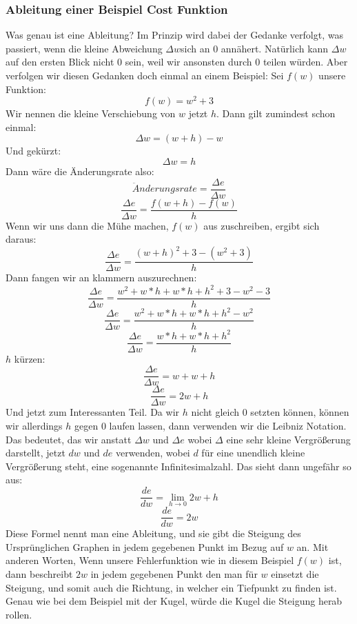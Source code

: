\documentclass[12pt]{article}
\begin{document}
\subsubsection{ Ableitung einer Beispiel Cost Funktion}
Was genau ist eine Ableitung? Im Prinzip wird dabei der Gedanke verfolgt, was passiert, wenn die kleine Abweichung $\Delta w$sich an 0 annähert. Natürlich kann $\Delta w$auf den ersten Blick nicht 0 sein, weil wir ansonsten durch 0 teilen würden. 
Aber verfolgen wir diesen Gedanken doch einmal an einem Beispiel:
Sei $f(w)$ unsere Funktion: $$f(w)=w^2+3$$
Wir nennen die kleine Verschiebung von $w$ jetzt $h$.
Dann gilt zumindest schon einmal: $$\Delta w=(w+h)-w$$Und gekürzt:$$\Delta w=h$$
Dann wäre die Änderungsrate also:$$\ddot{A}nderungsrate = \frac{\Delta e}{\Delta w}$$ $$\frac{\Delta e}{\Delta w}=\frac{f(w+h)-f(w)}{h}$$
Wenn wir uns dann die Mühe machen, $f(w)$ aus zuschreiben, ergibt sich daraus:
$$\frac{\Delta e}{\Delta w}=\frac{(w+h)^2+3-(w^2+3)}{h}$$
Dann fangen wir an klammern auszurechnen:
$$\frac{\Delta e}{\Delta w}=\frac{w^2+w*h+w*h+h^2+3-w^2-3}{h}$$
$$\frac{\Delta e}{\Delta w}=\frac{w^2+w*h+w*h+h^2-w^2}{h}$$
$$\frac{\Delta e}{\Delta w}=\frac{w*h+w*h+h^2}{h}$$
$h$ kürzen:
$$\frac{\Delta e}{\Delta w}=w+w+h$$
$$\frac{\Delta e}{\Delta w}=2w+h$$Und jetzt zum Interessanten Teil. Da wir $h$ nicht gleich 0 setzten können, können wir allerdings $h$ gegen 0 laufen lassen, dann verwenden wir die Leibniz Notation. Das bedeutet, das wir anstatt  $\Delta w$ und  $\Delta e$ wobei $\Delta$ eine sehr kleine Vergrößerung darstellt, jetzt $dw$ und $de$ verwenden, wobei $d$ für eine unendlich kleine Vergrößerung steht, eine sogenannte Infinitesimalzahl.
Das sieht dann ungefähr so aus:
$$\frac{de}{dw}=\lim_{h\to 0} 2w +h$$
$$\frac{de}{dw}=2w$$
Diese Formel nennt man eine Ableitung, und sie gibt die Steigung des Ursprünglichen Graphen in jedem gegebenen Punkt im Bezug auf $w$ an. Mit anderen Worten, Wenn unsere Fehlerfunktion wie in diesem Beispiel $f(w)$ ist, dann beschreibt $2w$ in jedem gegebenen Punkt den man für $w$ einsetzt die Steigung, und somit auch die Richtung, in welcher ein Tiefpunkt zu finden ist. Genau wie bei dem Beispiel mit der Kugel, würde die Kugel die Steigung herab rollen.
\end{document}
